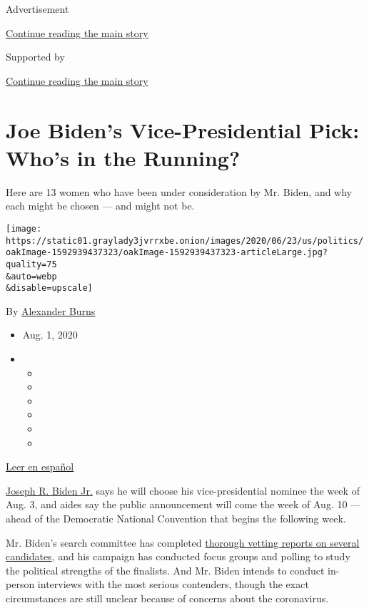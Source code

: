 Advertisement

\protect\hyperlink{after-top}{Continue reading the main story}

Supported by

\protect\hyperlink{after-sponsor}{Continue reading the main story}

\hypertarget{joe-bidens-vice-presidential-pick-whos-in-the-running}{%
\section{Joe Biden's Vice-Presidential Pick: Who's in the
Running?}\label{joe-bidens-vice-presidential-pick-whos-in-the-running}}

Here are 13 women who have been under consideration by Mr. Biden, and
why each might be chosen --- and might not be.

\texttt{[image: https://static01.graylady3jvrrxbe.onion/images/2020/06/23/us/politics/oakImage-1592939437323/oakImage-1592939437323-articleLarge.jpg?quality=75\\\&auto=webp\\\&disable=upscale]}

By
\href{https://www.nytimes3xbfgragh.onion/by/alexander-burns}{Alexander
Burns}

\begin{itemize}
\item
  Aug. 1, 2020
\item
  \begin{itemize}
  \item
  \item
  \item
  \item
  \item
  \item
  \end{itemize}
\end{itemize}

\href{https://www.nytimes3xbfgragh.onion/es/2020/07/29/espanol/estados-unidos/biden-vicepresidente.html}{Leer
en español}

\href{https://www.nytimes3xbfgragh.onion/interactive/2020/us/elections/joe-biden.html}{Joseph
R. Biden Jr.} says he will choose his vice-presidential nominee the week
of Aug. 3, and aides say the public announcement will come the week of
Aug. 10 --- ahead of the Democratic National Convention that begins the
following week.

Mr. Biden's search committee has completed
\href{https://www.nytimes3xbfgragh.onion/2020/07/31/us/politics/joseph-biden-vice-president.html}{thorough
vetting reports on several candidates}, and his campaign has conducted
focus groups and polling to study the political strengths of the
finalists. And Mr. Biden intends to conduct in-person interviews with
the most serious contenders, though the exact circumstances are still
unclear because of concerns about the coronavirus.

